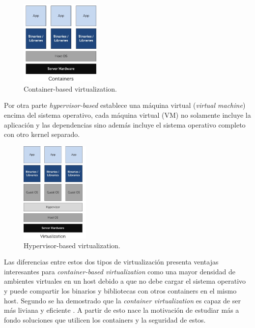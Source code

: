 	\begin{figure}[]
  		\centering
    	\includegraphics[width=0.35\textwidth]{Figures/containers.png}
    	\caption{Container-based virtualization.}
    	\label{fig:container-arch}
	\end{figure}
	Por otra parte \textit{hypervisor-based} establece una máquina virtual (\textit{virtual
	machine})   encima del sistema operativo, cada máquina virtual (VM) no solamente
	incluye la aplicación y las dependencias sino además incluye el sistema 
	operativo completo con otro kernel separado.

	\begin{figure}[]
 		\centering
    	\includegraphics[width=0.3\textwidth]{Figures/virtual.png}
    	\caption{Hypervisor-based virtualization.}
    	\label{fig:vm-arch}
	\end{figure}
	Las diferencias entre estos dos tipos de virtualización presenta ventajas interesantes para
	\textit{container-based virtualization} como una mayor densidad de ambientes
	virtuales en un host debido a que no debe cargar el sistema operativo y puede
	compartir los binarios y bibliotecas con otros containers en el mismo host.
	Segundo se ha demostrado que la \textit{container virtualization} es capaz de
	ser más liviana y eficiente \cite{padala2007performance,regola2010recommendations,felter2014updated}. A partir de esto nace la motivación de estudiar más a fondo soluciones que utilicen los containers y la seguridad de estos. \\


